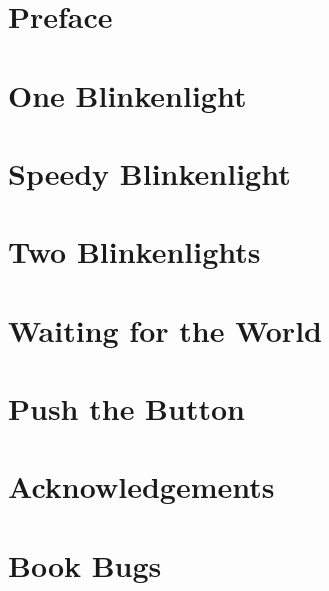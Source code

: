 \documentclass[a5paper,oneside]{scrbook}
\begin{document}
	


\tableofcontents

\chapter*{Preface\label{preface}}


\chapter{One Blinkenlight\label{ch1}}


\chapter{Speedy Blinkenlight\label{ch2}}


\chapter{Two Blinkenlights\label{ch3}}


\chapter*{Waiting for the World\label{medio1}}


\chapter{Push the Button\label{ch4}}



%

\chapter{Acknowledgements\label{acknowledgements}}


\chapter{Book Bugs\label{bugs}}

\end{document}
